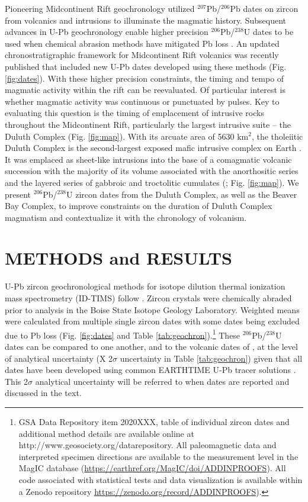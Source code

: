 \documentclass[11pt,letterpaper]{article}
\begin{document}
Pioneering Midcontinent Rift geochronology utilized $^{207}$Pb/$^{206}$Pb dates on zircon from volcanics \citep{Davis1997a} and intrusions \citep{Paces1993a} to illuminate the magmatic history. Subsequent advances in U-Pb geochronology enable higher precision $^{206}$Pb/$^{238}$U dates to be used when chemical abrasion methods have mitigated Pb loss \citep{Mattinson2005a}. An updated chronostratigraphic framework for Midcontinent Rift volcanics was recently published \citep{Swanson-Hysell2019a} that included new U-Pb dates developed using these methods (Fig. \ref{fig:dates}). With these higher precision constraints, the timing and tempo of magmatic activity within the rift can be reevaluated. Of particular interest is whether magmatic activity was continuous or punctuated by pulses. Key to evaluating this question is the timing of emplacement of intrusive rocks throughout the Midcontinent Rift, particularly the largest intrusive suite -- the Duluth Complex (Fig. \ref{fig:map}). With its arcuate area of 5630 km$^2$, the tholeiitic Duluth Complex is the second-largest exposed mafic intrusive complex on Earth \citep{Miller2002c}. It was emplaced as sheet-like intrusions into the base of a comagmatic volcanic succession with the majority of its volume associated with the anorthositic series and the layered series of gabbroic and troctolitic cumulates (\citealp{Miller2002c}; Fig. \ref{fig:map}). We present $^{206}$Pb/$^{238}$U zircon dates from the Duluth Complex, as well as the Beaver Bay Complex, to improve constraints on the duration of Duluth Complex magmatism and contextualize it with the chronology of volcanism.

\section*{METHODS and RESULTS}

U-Pb zircon geochronological methods for isotope dilution thermal ionization mass spectrometry (ID-TIMS) follow \citet{Schmitz2012a}. Zircon crystals were chemically abraded prior to analysis in the Boise State Isotope Geology Laboratory. Weighted means were calculated from multiple single zircon dates with some dates being excluded due to Pb loss (Fig. \ref{fig:dates} and Table \ref{tab:geochron}).\footnote{GSA Data Repository item 2020XXX, table of individual zircon dates and additional method details are available online at http://www.geosociety.org/datarepository. All paleomagnetic data and interpreted specimen directions are available to the measurement level in the MagIC database (\url{https://earthref.org/MagIC/doi/ADDINPROOFS}).  All code associated with statistical tests and data visualization is available within a Zenodo repository \url{https://zenodo.org/record/ADDINPROOFS}).} These $^{206}$Pb/$^{238}$U dates can be compared to one another, and to the volcanic dates of \cite{Swanson-Hysell2019a}, at the level of analytical uncertainty (X 2$\sigma$ uncertainty in Table \ref{tab:geochron}) given that all dates have been developed using common EARTHTIME U-Pb tracer solutions \citep{Condon2015a}. This 2$\sigma$ analytical uncertainty will be referred to when dates are reported and discussed in the text.
\end{document}
